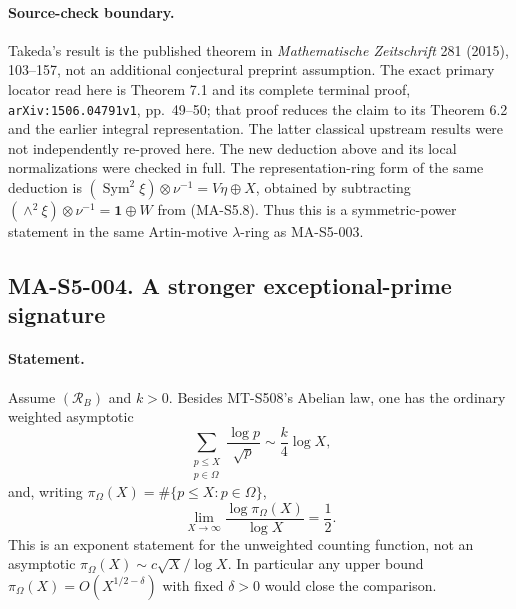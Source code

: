 \paragraph{Source-check boundary.}
Takeda's result is the published theorem in
\emph{Mathematische Zeitschrift} 281 (2015), 103--157, not an
additional conjectural preprint assumption. The exact primary
locator read here is Theorem 7.1 and its complete terminal proof,
\texttt{arXiv:1506.04791v1}, pp.~49--50; that proof reduces the
claim to its Theorem 6.2 and the earlier integral representation.
The latter classical upstream results were not independently
re-proved here. The new deduction above and its local
normalizations were checked in full. The representation-ring
form of the same deduction is
$(\operatorname{Sym}^2\xi)\otimes\nu^{-1}=V\eta\oplus X$,
obtained by subtracting
$(\wedge^2\xi)\otimes\nu^{-1}=\mathbf1\oplus W$
from (MA-S5.8). Thus this is a symmetric-power statement in the
same Artin-motive $\lambda$-ring as MA-S5-003.

\subsection*{MA-S5-004. A stronger exceptional-prime signature}

\paragraph{Statement.}
Assume $(\mathcal R_B)$ and $k>0$. Besides MT-S508's Abelian law,
one has the ordinary weighted asymptotic
\[
  \sum_{\substack{p\le X\\p\in\Omega}}
           \frac{\log p}{\sqrt p}
            \sim \frac{k}{4}\log X,
 \tag{MA-S5.12}
\]
and, writing $\pi_\Omega(X)=\#\{p\le X:p\in\Omega\}$,
\[
                 \lim_{X\to\infty}
                  \frac{\log \pi_\Omega(X)}{\log X}=\frac12.
 \tag{MA-S5.13}
\]
This is an exponent statement for the unweighted counting
function, not an asymptotic $\pi_\Omega(X)\sim c\sqrt X/\log X$.
In particular any upper bound $\pi_\Omega(X)=O(X^{1/2-\delta})$
with fixed $\delta>0$ would close the comparison.

